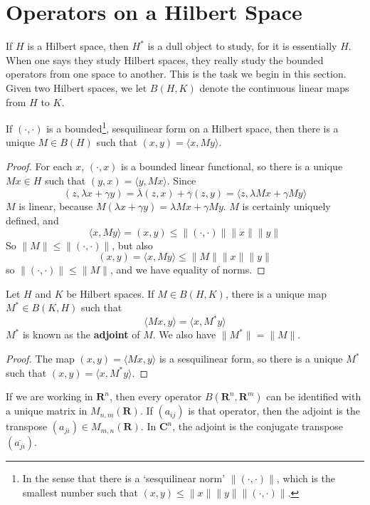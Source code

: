 \section{Operators on a Hilbert Space}

If $H$ is a Hilbert space, then $H^*$ is a dull object to study, for it is essentially $H$. When one says they study Hilbert spaces, they really study the bounded operators from one space to another. This is the task we begin in this section. Given two Hilbert spaces, we let $B(H,K)$ denote the continuous linear maps from $H$ to $K$.

\begin{lemma}
    If $( \cdot, \cdot )$ is a bounded\footnote{In the sense that there is a `sesquilinear norm' $\|(\cdot, \cdot)\|$, which is the smallest number such that $(x,y) \leq \| x \| \| y \| \|(\cdot, \cdot)\|$.}, sesquilinear form on a Hilbert space, then there is a unique $M \in B(H)$ such that $(x,y) = \langle x, My \rangle$.
\end{lemma}
\begin{proof}
    For each $x$, $(\cdot, x)$ is a bounded linear functional, so there is a unique $Mx \in H$ such that $(y,x) = \langle y, Mx \rangle$. Since
    \[ (z, \lambda x + \gamma y) = \overline{\lambda}(z, x) + \overline{\gamma}(z,y) = \langle z, \lambda Mx + \gamma My \rangle \]
    $M$ is linear, because $M(\lambda x + \gamma y) = \lambda Mx + \gamma My$. $M$ is certainly uniquely defined, and
    \[ \langle x, My \rangle = (x,y) \leq \|(\cdot, \cdot)\| \| x \| \| y \| \]
    So $\| M \| \leq \|(\cdot,\cdot)\|$, but also
    \[ (x,y) = \langle x, My \rangle \leq \| M \| \| x \| \| y \| \]
    so $\|(\cdot, \cdot)\| \leq \| M \|$, and we have equality of norms.
\end{proof}

\begin{theorem}
    Let $H$ and $K$ be Hilbert spaces. If $M \in B(H,K)$, there is a unique map $M^* \in B(K,H)$ such that
    \[ \langle Mx, y \rangle = \langle x, M^*y \rangle \]
    $M^*$ is known as the {\bf adjoint} of $M$. We also have $\| M^* \| = \| M \|$.
\end{theorem}
\begin{proof}
    The map $(x,y) = \langle Mx, y \rangle$ is a sesquilinear form, so there is a unique $M^*$ such that $(x,y) = \langle x, M^*y \rangle$.
\end{proof}

\begin{example}
    If we are working in $\mathbf{R}^n$, then every operator $B(\mathbf{R}^n, \mathbf{R}^m)$ can be identified with a unique matrix in $M_{n,m}(\mathbf{R})$. If $(a_{ij})$ is that operator, then the adjoint is the transpose $(a_{ji}) \in M_{m,n}(\mathbf{R})$. In $\mathbf{C}^n$, the adjoint is the conjugate transpose $(\overline{a_{ji}})$.
\end{example}

